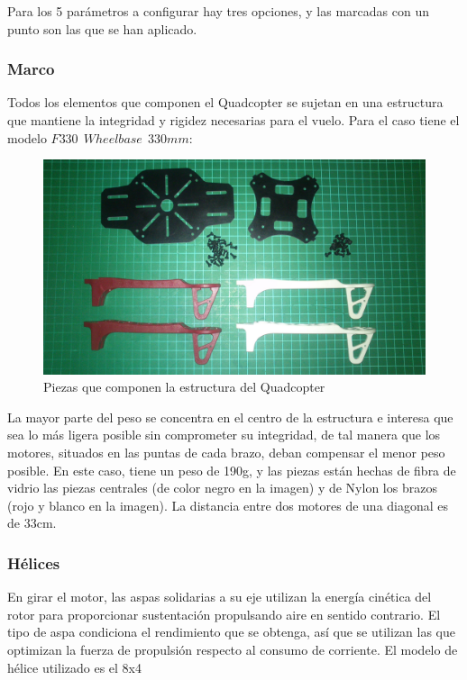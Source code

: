\documentclass[twoside,11pt]{report}
\begin{document}
Para los 5 parámetros a configurar hay tres opciones, y las marcadas con un punto son las que se han aplicado.

\subsubsection*{Marco}

Todos los elementos que componen el Quadcopter se sujetan en una estructura que mantiene la integridad y rigidez necesarias para el vuelo. Para el caso tiene el modelo $F330\>\>Wheelbase\>\>330mm$:

\begin{figure}[h!]
\begin{center}
\includegraphics[scale=0.1]{images/frame.jpg}
\caption{Piezas que componen la estructura del Quadcopter}
\end{center}
\end{figure}

La mayor parte del peso se concentra en el centro de la estructura e interesa que sea lo más ligera posible sin comprometer su integridad, de tal manera que los motores, situados en las puntas de cada brazo, deban compensar el menor peso posible. En este caso, tiene un peso de 190g, y las piezas están hechas de fibra de vidrio las piezas centrales (de color negro en la imagen) y de Nylon los brazos (rojo y blanco en la imagen). La distancia entre dos motores de una diagonal es de 33cm.


\subsubsection*{Hélices}

En girar el motor, las aspas solidarias a su eje utilizan la energía cinética del rotor para proporcionar sustentación propulsando aire en sentido contrario. El tipo de aspa condiciona el rendimiento que se obtenga, así que se utilizan las que optimizan la fuerza de propulsión respecto al consumo de corriente. El modelo de hélice utilizado es el 8x4
\end{document}
